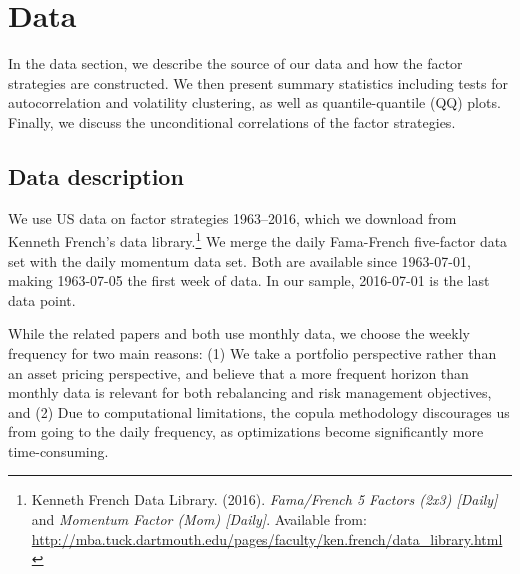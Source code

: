 \section{Data}
\label{sec:data}
In the data section, we describe the source of our data and how the factor strategies are constructed. We then present summary statistics including tests for autocorrelation and volatility clustering, as well as quantile-quantile (QQ) plots. Finally, we discuss the unconditional correlations of the factor strategies.

\subsection{Data description}

We use US data on factor strategies 1963--2016, which we download from Kenneth French's data library.\footnote{Kenneth French Data Library. (2016). \textit{Fama/French 5 Factors (2x3) [Daily]} and \textit{Momentum Factor (Mom) [Daily]}. Available from: \url{http://mba.tuck.dartmouth.edu/pages/faculty/ken.french/data_library.html}} We merge the daily Fama-French five-factor data set with the daily momentum data set. Both are available since 1963-07-01, making 1963-07-05 the first week of data. In our sample, 2016-07-01 is the last data point. 

While the related papers \textcite{FF2015} and \textcite{Asness2015} both use monthly data, we choose the weekly frequency for two main reasons: (1) We take a portfolio perspective rather than an asset pricing perspective, and believe that a more frequent horizon than monthly data is relevant for both rebalancing and risk management objectives, and (2) Due to computational limitations, the copula methodology discourages us from going to the daily frequency, as optimizations become significantly more time-consuming.

